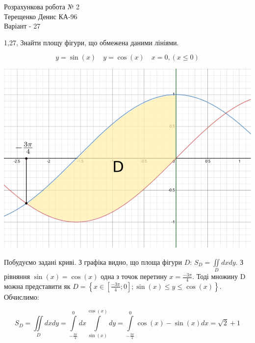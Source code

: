 \documentclass[14pt,a4paper]{scrartcl}
\theoremstyle{definition}
\newtheorem{defo}{Означення}[section]
\theoremstyle{remark}
\theoremstyle{definition}
\theoremstyle{definition}
\begin{document}
\def\be{\begin{equation}}
\def\ee{\end{equation}}
\def\bd{\begin{defo}}
\def\ed{\end{defo}}
\def\bbt{\begin{boxteo}}
\def\ebt{\end{boxteo}}
\begin{center}
Розрахункова робота № 2 \\
	Терещенко Денис КА-96 \\
	Варіант - 27
\end{center}

1,27, Знайти площу фігури, що обмежена даними лініями.

$$
y = \sin{(x)} \quad y = \cos{(x)} \quad x=0, (x\leq 0)
$$
\begin{center} \includegraphics[scale=0.5]{1.png} \end{center}
Побудуємо задані криві. З графіка видно, що площа фігури $D$: $S_D =  \iint\limits_{D}{dxdy}$. З рівняння $\sin{(x)} = \cos{(x)}$ одна з точок перетину $x = \frac{-3\pi}{4} $. Тоді множину D можна представити як $D = \left\lbrace x \in [\frac{-3\pi}{4}; 0 ]; \sin{(x)} \leq y \leq \cos{(x)}   \right\rbrace $. Обчислимо:

$$
S_D =  \iint\limits_{D}{dxdy} =  \int\limits_{- \frac{3\pi}{4} }^{ 0}{dx  \int\limits_{\sin{(x)} }^{ \cos{(x)} }{dy}} = \int\limits_{- \frac{3\pi}{4} }^{ 0}{ \cos{(x)}- \sin{(x)} dx } = \sqrt{2} + 1
$$

\pagebreak
\end{document}
